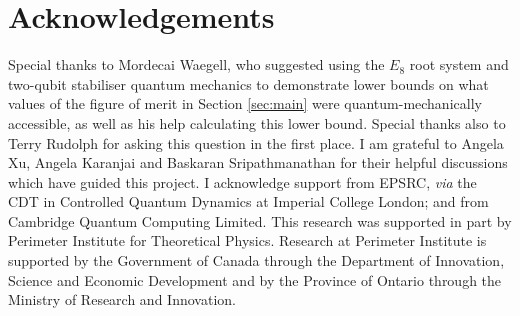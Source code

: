 \documentclass{amsart}
\theoremstyle{definition}
\begin{document}
\section{Acknowledgements}
Special thanks to Mordecai Waegell, who suggested using the $E_8$ root system and two-qubit stabiliser quantum mechanics to demonstrate lower bounds on what values of the figure of merit in Section \ref{sec:main} were quantum-mechanically accessible, as well as his help calculating this lower bound.
Special thanks also to Terry Rudolph for asking this question in the first place.
I am grateful to Angela Xu, Angela Karanjai and Baskaran Sripathmanathan for their helpful discussions which have guided this project. I acknowledge support from EPSRC, \emph{via} the CDT in Controlled Quantum Dynamics at Imperial College London; and from Cambridge Quantum Computing Limited. This research was supported in part by Perimeter Institute for Theoretical Physics. Research at Perimeter Institute is supported by the Government of Canada through the Department of Innovation, Science and Economic Development and by the Province of Ontario through the Ministry of Research and Innovation.

{}

\end{document}

